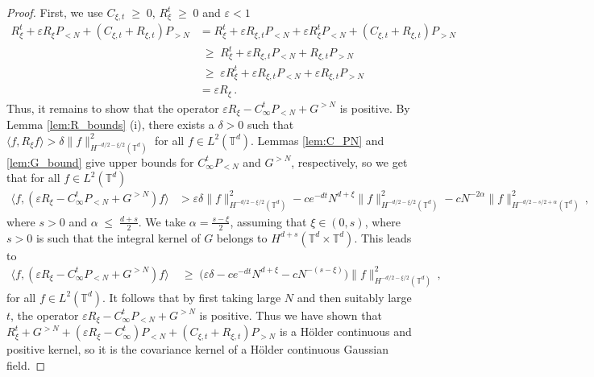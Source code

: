 \documentclass[11pt]{article}
\numberwithin{equation}{section}
\theoremstyle{definition}
\renewcommand{\leq}{\;\leqslant\;}                   %
\renewcommand{\geq}{\;\geqslant\;}                   %
\def\eps{\varepsilon}
\def\T{\mathbb{T}}
\newcommand{\PN}{ {P_{< N}} }
\newcommand{\PNN}{ {P_{>N}} }
\begin{document}
\begin{proof}
First, we use $C_{\xi,t} \geq 0$, $R_\xi^t \geq 0$ and $\eps < 1$ 
\begin{align*}
R_\xi^t + \eps R_\xi \PN + (C_{\xi,t} + R_{\xi,t}) \PNN &= R_\xi^t + \eps R_{\xi,t} \PN + \eps R_{\xi}^t \PN + (C_{\xi,t} + R_{\xi,t}) \PNN \\
 &\geq R_\xi^t + \eps R_{\xi,t} \PN + R_{\xi,t} \PNN \\
& \geq \eps R_\xi^t + \eps R_{\xi,t} \PN + \eps R_{\xi,t} \PNN \\
& = \eps R_\xi\,.
\end{align*}
Thus, it remains to show that the operator $\eps R_\xi  - C_\infty^t \PN + G^{>N}$ is positive. By Lemma \ref{lem:R_bounds} (i), there exists a  $\delta >0 $ such that  $\langle f, R_\xi f \rangle > \delta \| f \|^2_{H^{-d/2-\xi/2}(\T^d)}$ for all $f \in L^2(\T^d)$. Lemmas \ref{lem:C_PN} and \ref{lem:G_bound} give upper bounds for $C_\infty^t \PN$ and $G^{>N}$, respectively, so we get that for all $f \in L^2(\T^d)$
\begin{align*}
\langle f, (\eps R_\xi  - C_\infty^t \PN + G^{>N} ) f \rangle &> \eps \delta \|  f\|_{H^{-d/2-\xi/2}(\T^d)}^2 - c e^{-dt} N^{d+\xi} \|  f \|_{H^{-d/2-\xi/2}(\T^d)}^2  - c  N^{-2 \alpha} \|f\|_{H^{-d/2-s/2+\alpha}(\T^d)}^2\,,
\end{align*}
where $s>0$ and  $\alpha \leq \frac{d+s}{2}$. We take $\alpha = \frac{s-\xi}{2}$, assuming that $\xi \in (0,s)$, where $s>0$ is such that the integral kernel of $G$ belongs to $H^{d+s}(\T^d \times \T^d)$. This leads to 
\begin{align*}
\langle f, (\eps R_\xi  - C_\infty^t \PN + G^{>N} ) f \rangle & \geq  \big( \eps \delta    - c e^{-dt} N^{d + \xi }  - c N^{ -(s-\xi) } \big) \| f\|_{H^{-d/2-\xi/2}(\T^d)}^2 \,,
\end{align*}
for all $f \in L^2(\T^d)$. It follows that by first taking large $N$ and then suitably large $t$, the operator $\eps R_\xi  - C_\infty^t \PN + G^{>N}$ is positive. Thus we have shown that $R_\xi^t + G^{>N} +  (   \eps R_\xi - C_\infty^t  ) \PN  +  (C_{\xi,t} + R_{\xi,t}) \PNN$ is a Hölder continuous and positive kernel, so it is the covariance kernel of a Hölder continuous Gaussian field.
\end{proof}
\end{document}
